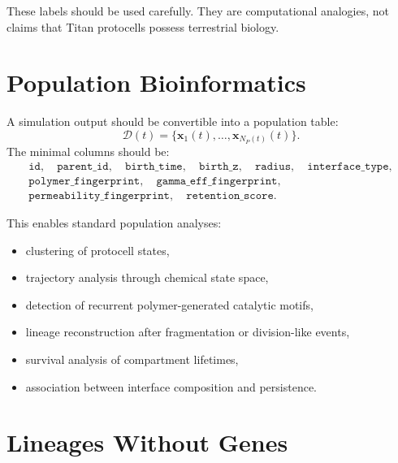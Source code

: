 \documentclass[11pt]{article}
\begin{document}
These labels should be used carefully. They are computational analogies, not claims that Titan protocells possess terrestrial biology.

\section{Population Bioinformatics}

A simulation output should be convertible into a population table:
\begin{equation}
\mathcal{D}(t)
=
\{ \mathbf{x}_1(t),\ldots,\mathbf{x}_{N_P(t)}(t) \}.
\end{equation}
The minimal columns should be:
\begin{equation}
\begin{aligned}
\texttt{id},\quad
\texttt{parent\_id},\quad
\texttt{birth\_time},\quad
\texttt{birth\_z},\quad
\texttt{radius},\quad
\texttt{interface\_type},\\
\texttt{polymer\_fingerprint},\quad
\texttt{gamma\_eff\_fingerprint},\\
\texttt{permeability\_fingerprint},\quad
\texttt{retention\_score}.
\end{aligned}
\end{equation}

This enables standard population analyses:
\begin{itemize}
\item clustering of protocell states,
\item trajectory analysis through chemical state space,
\item detection of recurrent polymer-generated catalytic motifs,
\item lineage reconstruction after fragmentation or division-like events,
\item survival analysis of compartment lifetimes,
\item association between interface composition and persistence.
\end{itemize}

\section{Lineages Without Genes}
\end{document}
